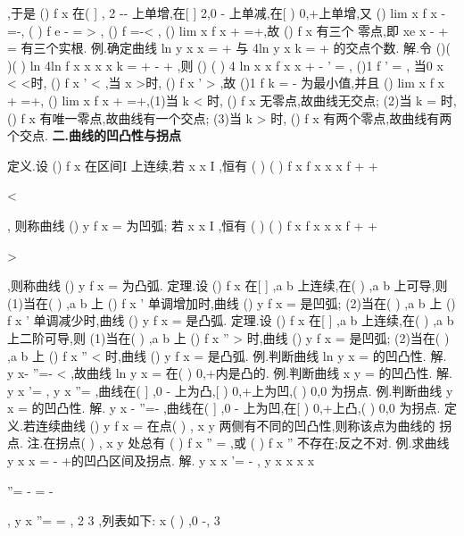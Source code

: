 ,于是 
()
f x 在(
]
, 2
-\infty -
上单增,在[
]
2,0
-
上单减,在[
)
0,+\infty 上单增,又 
()
lim
x
f x
\to -\infty 
=-\infty ,
(
)
f
e
-
=
>
,
()
f
=-<
,
()
lim
x
f x
\to +\infty 
=+\infty ,故
()
f x 有三个 
零点,即
xe
x
-
+
=
有三个实根. 
\textcolor{lyred}{例}.确定曲线
ln
y
x
x
=
+
与
4ln
y
x
k
=
+
的交点个数. 
解.令
()(
)(
)
ln
4ln
f x
x
x
x
k
=
+
-
+
,则
()
(
)
4 ln
x
x
f
x
x
+
-
'
=
,
()1
f '
=
, 
当0
x
<
<时,
()
f
x
'
<
,当
x >时,
()
f
x
'
>
,故
()1
f
k
=
-
为最小值,并且 
()
lim
x
f x
\to +\infty 
=+\infty ,
()
lim
x
f x
+
\to 
=+\infty ,(1)当
k <
时,
()
f x 无零点,故曲线无交点; 
(2)当
k =
时,
()
f x 有唯一零点,故曲线有一个交点; 
(3)当
k >
时,
()
f x 有两个零点,故曲线有两个交点. 
\vspace{4pt}
{\bfseries \textcolor{lyred}{二.曲线的凹凸性与拐点}}

\textcolor{lyred}{定义}.设
()
f x 在区间I 上连续,若
x
x
I
\forall 
\neq 
\in 
,恒有
(
)
(
)
f x
f x
x
x
f
+
+

<




, 
则称曲线
()
y
f x
=
为\textcolor{lyred}{凹弧}; 
若
x
x
I
\forall 
\neq 
\in 
,恒有
(
)
(
)
f x
f x
x
x
f
+
+

>




,则称曲线
()
y
f x
=
为\textcolor{lyred}{凸弧}. 
\textcolor{lyred}{定理}.设
()
f x 在[
]
,a b 上连续,在(
)
,a b 上可导,则 
(1)当在(
)
,a b 上
()
f
x
'
单调增加时,曲线
()
y
f x
=
是凹弧; 
(2)当在(
)
,a b 上
()
f
x
'
单调减少时,曲线
()
y
f x
=
是凸弧. 
\textcolor{lyred}{定理}.设
()
f x 在[
]
,a b 上连续,在(
)
,a b 上二阶可导,则 
(1)当在(
)
,a b 上
()
f
x
''
>
时,曲线
()
y
f x
=
是凹弧; 
(2)当在(
)
,a b 上
()
f
x
''
<
时,曲线
()
y
f x
=
是凸弧. 
\textcolor{lyred}{例}.判断曲线
ln
y
x
=
的凹凸性. 
解.
y
x-
''=-
<
,故曲线
ln
y
x
=
在(
)
0,+\infty 内是凸的. 
\textcolor{lyred}{例}.判断曲线
x
y =
的凹凸性. 
解.
y
x
'=
,
y
x
''=
,曲线在(
]
,0
-\infty 
上为凸,[
)
0,+\infty 上为凹,(
)
0,0 为拐点. 
\textcolor{lyred}{例}.判断曲线
y
x
=
的凹凸性. 
解.
y
x
-
''=-
,曲线在(
]
,0
-\infty 
上为凹,在[
)
0,+\infty 上凸,(
)
0,0 为拐点. 
\textcolor{lyred}{定义}.若连续曲线
()
y
f x
=
在点(
)
,
x
y
两侧有不同的凹凸性,则称该点为曲线的 
\textcolor{lyred}{拐点}. 
\textcolor{lyred}{注}.在拐点(
)
,
x
y
处总有
(
)
f
x
''
=
,或
(
)
f
x
''
不存在;反之不对. 
\textcolor{lyred}{例}.求曲线
y
x
x
=
-
+的凹凸区间及拐点. 
解.
y
x
x
'=
-
,
y
x
x
x x


''=
-
=
-




,
y
x
''=
\Rightarrow 
=
, 2
3 ,列表如下: 
x       (
)
,0
-, 3






